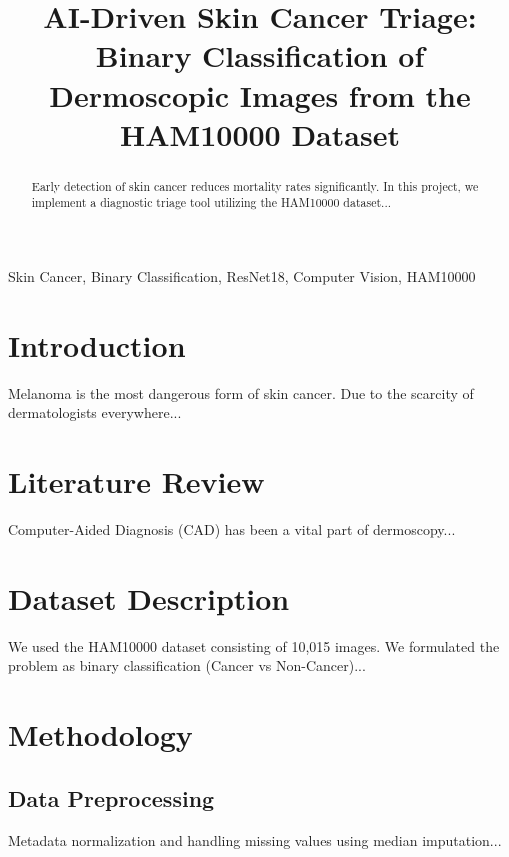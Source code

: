 \documentclass[conference]{IEEEtran}
\begin{document}
\title{AI-Driven Skin Cancer Triage: Binary Classification of Dermoscopic Images from the HAM10000 Dataset}

\author{
\and
{}
}

\maketitle

\begin{abstract}
Early detection of skin cancer reduces mortality rates significantly. In this project, we implement a diagnostic triage tool utilizing the HAM10000 dataset...
\end{abstract}

\begin{IEEEkeywords}
Skin Cancer, Binary Classification, ResNet18, Computer Vision, HAM10000
\end{IEEEkeywords}

\section{Introduction}
Melanoma is the most dangerous form of skin cancer. Due to the scarcity of dermatologists everywhere...

\section{Literature Review}
Computer-Aided Diagnosis (CAD) has been a vital part of dermoscopy...

\section{Dataset Description}
We used the HAM10000 dataset consisting of 10,015 images. We formulated the problem as binary classification (Cancer vs Non-Cancer)...

\section{Methodology}
\subsection{Data Preprocessing}
Metadata normalization and handling missing values using median imputation...
\end{document}
